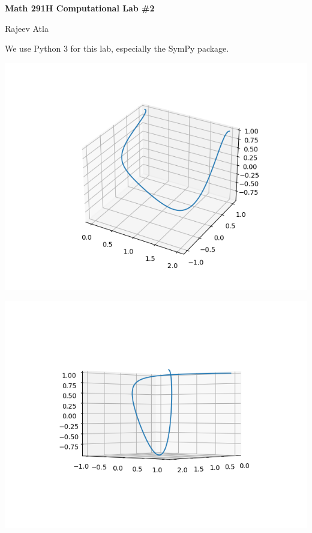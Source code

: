 \documentclass{article}
\begin{document}
\begin{center}
    \Large \textbf{Math 291H Computational Lab \#2}
\end{center}
  
\begin{center}
    \Large Rajeev Atla
\end{center}


We use Python 3 for this lab, especially the SymPy package.




\includegraphics{fig1.png}

\includegraphics{fig2.png}
\end{document}
